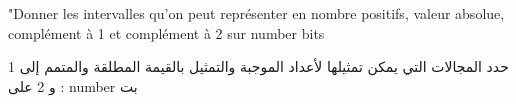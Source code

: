 "Donner les intervalles qu'on peut représenter en nombre positifs, valeur absolue, complément à 1 et complément à 2  sur {{number}} bits


\begin{arab}[utf]
حدد المجالات التي يمكن تمثيلها لأعداد الموجبة والتمثيل بالقيمة المطلقة والمتمم إلى 1 و 2 على   : {{number}} بت
\end{arab}